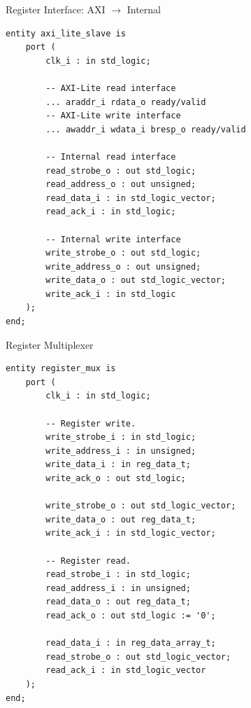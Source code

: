 \documentclass[xcolor=table]{beamer}
\begin{document}
%
\begin{frame}[fragile]{Register Interface: AXI $\to$ Internal}

\begin{lstlisting}
entity axi_lite_slave is
    port (
        clk_i : in std_logic;

        -- AXI-Lite read interface
        ... araddr_i rdata_o ready/valid
        -- AXI-Lite write interface
        ... awaddr_i wdata_i bresp_o ready/valid

        -- Internal read interface
        read_strobe_o : out std_logic;
        read_address_o : out unsigned;
        read_data_i : in std_logic_vector;
        read_ack_i : in std_logic;

        -- Internal write interface
        write_strobe_o : out std_logic;
        write_address_o : out unsigned;
        write_data_o : out std_logic_vector;
        write_ack_i : in std_logic
    );
end;
\end{lstlisting}

\end{frame}


%
\begin{frame}[fragile]{Register Multiplexer}

\begin{lstlisting}
entity register_mux is
    port (
        clk_i : in std_logic;

        -- Register write.
        write_strobe_i : in std_logic;
        write_address_i : in unsigned;
        write_data_i : in reg_data_t;
        write_ack_o : out std_logic;

        write_strobe_o : out std_logic_vector;
        write_data_o : out reg_data_t;
        write_ack_i : in std_logic_vector;

        -- Register read.
        read_strobe_i : in std_logic;
        read_address_i : in unsigned;
        read_data_o : out reg_data_t;
        read_ack_o : out std_logic := '0';

        read_data_i : in reg_data_array_t;
        read_strobe_o : out std_logic_vector;
        read_ack_i : in std_logic_vector
    );
end;
\end{lstlisting}

\end{frame}
\end{document}
